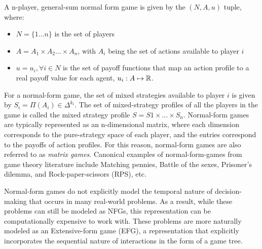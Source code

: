 \begin{definition} A n-player, general-sum normal form game is given by the $(N,
		A, u)$ tuple, where:
	\begin{itemize}
		\item $N = \{1 \dots n \}$ is the set of players
		\item $A =
			      A_1 \times A_2 \ldots \times A_n$, with $A_i$ being the set of actions available to player $i$
		\item $u = {u_i, \forall i \in N}$ is the set of payoff functions that map an action profile to a
		      real payoff value for each agent, $u_i: A \mapsto \mathbb{R}$.
	\end{itemize}
\end{definition}

For a normal-form game, the set of mixed strategies available to player $i$ is given by $S_i =
	\Pi(A_i) \in \Delta^{k_i}$.
The set of mixed-strategy profiles of all the players in the game is called the mixed strategy
profile $S = S1 \times \dots \times S_n$.
Normal-form games are typically represented as an n-dimensional matrix, where each dimension
corresponds to the pure-strategy space of each player, and the entries correspond to the payoffs of
action profiles.
For this reason, normal-form games are also referred to as \textit{matrix games}.
Canonical examples of normal-form-games from game theory literature include Matching pennies,
Battle of the sexes, Prisoner's dilemma, and Rock-paper-scissors (RPS), etc.

Normal-form games do not explicitly model the temporal nature of decision-making that occurs in
many real-world problems.
As a result, while these problems can still be modeled as NFGs, this representation can be
computationally expensive to work with.
These problems are more naturally modeled as an Extensive-form game (EFG), a representation that
explicitly incorporates the sequential nature of interactions in the form of a game tree.

